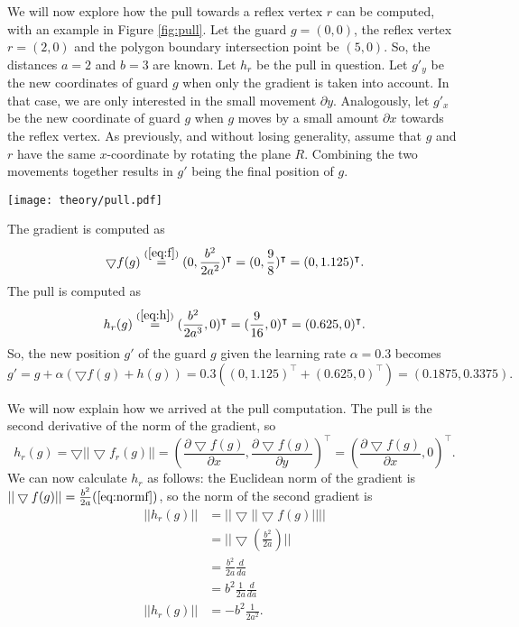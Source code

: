 We will now explore how the pull towards a reflex vertex $r$ can be computed, with an example in Figure \ref{fig:pull}. Let the guard $g = (0, 0)$, the reflex vertex $r = (2, 0)$ and the polygon boundary intersection point be $(5, 0)$. So, the distances $a = 2$ and $b = 3$ are known. Let $h_r$ be the pull in question. Let $g'_y$ be the new coordinates of guard $g$ when only the gradient is taken into account. In that case, we are only interested in the small movement $\partial y$. Analogously, let $g'_x$ be the new coordinate of guard $g$ when $g$ moves by a small amount $\partial x$ towards the reflex vertex. As previously, and without losing generality, assume that $g$ and $r$ have the same $x$-coordinate by rotating the plane $R$. Combining the two movements together results in $g'$ being the final position of $g$.

\begin{figure*}[!h]
    \texttt{[image: theory/pull.pdf]}
    \centering
    \caption{Computing the movements of the guard $g$ based on both the gradient and the pull towards reflex vertex $r$. The new position of the guard with learning rate $\alpha = 0.3$ becomes $g' = (0.1875, 0.3375)$.}
    \label{fig:pull}
\end{figure*}

The gradient is computed as
$$\bigtriangledown f(g) \overset{(\ref{eq:f})}{=} (0, \frac{b^2}{2a^2})^\intercal = (0, \frac{9}{8})^\intercal = (0, 1.125)^\intercal.$$ 
The pull is computed as 
$$h_r(g) \overset{(\ref{eq:h})}{=} (\frac{b^2}{2a^3}, 0)^\intercal = (\frac{9}{16}, 0)^\intercal = (0.625, 0)^\intercal.$$
So, the new position $g'$ of the guard $g$ given the learning rate $\alpha = 0.3$ becomes 
$$g' = g + \alpha(\bigtriangledown f(g) + h(g)) = 0.3 ((0, 1.125)^\intercal + (0.625, 0)^\intercal) = (0.1875, 0.3375).$$

We will now explain how we arrived at the pull computation. The pull is the second derivative of the norm of the gradient, so 
$$h_r(g) = \bigtriangledown ||\bigtriangledown f_r(g)|| = \left(\frac{\partial \bigtriangledown f(g)}{\partial x}, \frac{\partial \bigtriangledown f(g)}{\partial y}\right)^\intercal = \left(\frac{\partial \bigtriangledown f(g)}{\partial x}, 0\right)^\intercal.$$  
We can now calculate $h_r$ as follows: the Euclidean norm of the gradient is $||\bigtriangledown f(g)|| = \frac{b^2}{2a} (\ref{eq:normf})$, so the norm of the second gradient is 
\begin{align*}
||h_r(g)||&= ||\bigtriangledown ||\bigtriangledown f(g)|||| \\
       &= ||\bigtriangledown (\frac{b^2}{2a})|| \\
       &= \frac{b^2}{2a}\frac{d}{da} \\
       &= b^2\frac{1}{2a}\frac{d}{da} \\
||h_r(g)||&= -b^2\frac{1}{2a^2}.
\end{align*}

